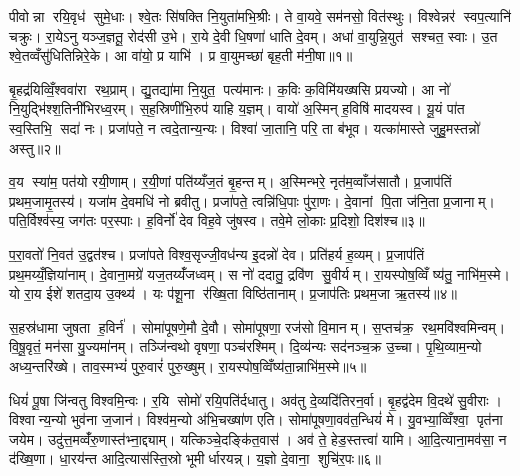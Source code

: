 
\clearpage
{}
\setcounter{anuvakam}{0}
पीवोन्ना रयि॒वृध॑ सुमे॒धाः। श्वे॒तः सि॑षक्ति नि॒युता॑मभि॒श्रीः। ते वा॒यवे॒ सम॑नसो॒ वित॑स्थुः। विश्वेन्नर॑ स्वप॒त्यानि॑ चक्रुः। रा॒येऽनु यञ्ज॒ज्ञतू॒ रोद॑सी उ॒भे। रा॒ये दे॒वी धि॒षणा॑ धाति दे॒वम्। अधा॑ वा॒युन्नि॒युत॑ सश्चत॒ स्वाः। उ॒त श्वे॒तव्वँसु॑धितिन्निरे॒के। आ वा॑यो॒ प्र याभि॑। प्र वा॒युमच्छा॑ बृह॒ती म॑नी॒षा॥१॥

बृ॒हद्र॑यिव्विँ॒श्ववा॑रा रथ॒प्राम्। द्यु॒तद्या॑मा नि॒युत॒ पत्य॑मानः। क॒विः क॒विमि॑यख्षसि प्रयज्यो। आ नो॑ नि॒युद्भि॑श्श॒तिनी॑भिरध्व॒रम्। स॒ह॒स्रिणी॑भि॒रुप॑ याहि य॒ज्ञम्। वायो॑ अ॒स्मिन् ह॒विषि॑ मादयस्व। यू॒यं पा॑त स्व॒स्तिभि॒ सदा॑ नः। प्रजा॑पते॒ न त्वदे॒तान्य॒न्यः। विश्वा॑ जा॒तानि॒ परि॒ ता ब॑भूव। यत्का॑मास्ते जुहु॒मस्तन्नो॑ अस्तु॥२॥

व॒य स्या॑म॒ पत॑यो रयी॒णाम्। र॒यी॒णां पति॑य्यँज॒तं बृ॒हन्तम्। अ॒स्मिन्भरे॒ नृत॑म॒व्वाँज॑सातौ। प्र॒जाप॑तिं प्रथम॒जामृ॒तस्य॑। यजा॑म दे॒वमधि॑ नो ब्रवीतु। प्रजा॑पते॒ त्वन्नि॑धि॒पाः पु॑रा॒णः। दे॒वानां पि॒ता ज॑नि॒ता प्र॒जानाम्। पति॒र्विश्व॑स्य॒ जग॑तः पर॒स्पाः। ह॒विर्नो॑ देव विह॒वे जु॑षस्व। तवे॒मे लो॒काः प्र॒दिशो॒ दिश॑श्च॥३॥

प॒रा॒वतो॑ नि॒वत॑ उ॒द्वत॑श्च। प्रजा॑पते विश्व॒सृज्जी॒वध॑न्य इ॒दन्नो॑ देव। प्रति॑हर्य ह॒व्यम्। प्र॒जाप॑तिं प्रथ॒मय्यँ॒ज्ञिया॑नाम्। दे॒वाना॒मग्रे॑ यज॒तय्यँ॑जध्वम्। स नो॑ ददातु॒ द्रवि॑ण सु॒वीर्यम्। रा॒यस्पोष॒व्विँ ष्य॑तु॒ नाभि॑म॒स्मे। यो रा॒य ईशे॑ शतदा॒य उ॒क्थ्य॑। यः प॑शू॒ना र॑ख्षि॒ता विष्ठि॑तानाम्। प्र॒जाप॑तिः प्रथम॒जा ऋ॒तस्य॑॥४॥

स॒हस्र॑धामा जुषता ह॒विर्न॑। सोमा॑पूषणे॒मौ दे॒वौ। सोमा॑पूषणा॒ रज॑सो वि॒मानम्। स॒प्तच॑क्र॒ रथ॒मवि॑श्वमिन्वम्। वि॒षू॒वृतं॒ मन॑सा यु॒ज्यमा॑नम्। तञ्जि॑न्वथो वृषणा॒ पञ्च॑रश्मिम्। दि॒व्य॑न्यः सद॑नञ्च॒क्र उ॒च्चा। पृ॒थि॒व्याम॒न्यो अध्य॒न्तरि॑ख्षे। ताव॒स्मभ्यं॑ पुरु॒वारं॑ पुरु॒ख्षुम्। रा॒यस्पोष॒व्विँष्य॑ता॒न्नाभि॑म॒स्मे॥५॥

धियं॑ पू॒षा जि॑न्वतु विश्वमि॒न्वः। र॒यि सोमो॑ रयि॒पति॑र्दधातु। अव॑तु दे॒व्यदि॑तिरन॒र्वा। बृ॒हद्व॑देम वि॒दथे॑ सु॒वीराः। विश्वान्य॒न्यो भुव॑ना ज॒जान॑। विश्व॑म॒न्यो अ॑भि॒चख्षा॑ण एति। सोमा॑पूषणा॒वव॑त॒न्धियं॑ मे। यु॒वभ्या॒व्विँश्वा॒ पृत॑ना जयेम। उदु॑त्त॒मव्वँ॑रु॒णास्त॑भ्ना॒द्द्याम्। यत्किञ्चे॒दङ्कि॑त॒वास॑। अव॑ ते॒ हेड॒स्तत्त्वा॑ यामि। आ॒दि॒त्याना॒मव॑सा॒ न द॑ख्षि॒णा। धा॒रय॑न्त आदि॒त्यास॑स्ति॒स्रो भूमीर्धारयन्न्। य॒ज्ञो दे॒वाना॒ शुचि॑र॒पः॥६॥\anuvakamend[म॒नी॒षाऽस्तु॑ च॒र्तस्या॒स्मे कि॑त॒वास॑श्च॒त्वारि॑ च]

